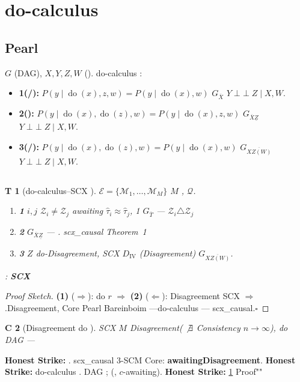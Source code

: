 \documentclass[11pt,a4paper,twoside]{article}
\newtheorem{theorem}Theorem[section]
\newtheorem{corollary}[theorem]Corollary
\DeclareMathOperator{\doop}{do}
\DeclareMathOperator{\indep}{\perp\!\!\!\perp}
\begin{document}
\section{do-calculus}
\subsection{Pearl}
 $G$ (DAG), $X, Y, Z, W$ ().
do-calculus \citep{pearl2009causality}: 
\begin{itemize}[leftmargin=*]
 \item \textbf{ 1(/): }
 $P(y \mid \doop(x), z, w) = P(y \mid \doop(x), w)$
 $G_{\overline{X}}$ $Y \indep Z \mid X, W$.
 \item \textbf{ 2(): }
 $P(y \mid \doop(x), \doop(z), w) = P(y \mid \doop(x), z, w)$
 $G_{\overline{X}\underline{Z}}$ $Y \indep Z \mid X, W$.
 \item \textbf{ 3(/): }
 $P(y \mid \doop(x), \doop(z), w) = P(y \mid \doop(x), w)$
 $G_{\overline{XZ(W)}}$ $Y \indep Z \mid X, W$.
\end{itemize}
\subsection{}
\begin{theorem}[do-calculus--SCX ]\label{thm:bridge}
 $\mathcal{E} = \{\mathcal{M}_1, \ldots, \mathcal{M}_M\}$ $M$ 
, $\mathcal{Q}$.
\begin{enumerate}[label=(\arabic*),leftmargin=*]
 \item \textbf{ 1}
 $i, j$ $\mathcal{Z}_i \neq \mathcal{Z}_j$
 awaiting $\hat{\tau}_i \approx \hat{\tau}_j$, 1 
 $G_{\overline{T}}$ ---
 $\mathcal{Z}_i \triangle \mathcal{Z}_j$ 
 \item \textbf{ 2}
 $G_{\overline{X}\underline{Z}}$ ---
 . scx\_causal Theorem~1 
 \item \textbf{ 3}
 $Z$ do-Disagreement, SCX 
 $D_{\text{IV}}$ (Disagreement)
 $G_{\overline{XZ(W)}}$.
\end{enumerate}
: \textbf{SCX}
\end{theorem}
\begin{proof}[Proof Sketch]
\noindent\textbf{(1)} ($\Rightarrow$): do $r$ $\Rightarrow$
\noindent\textbf{(2)} ($\Leftarrow$): Disagreement SCX 
$\Rightarrow$.Disagreement, 
Core Pearl Bareinboim ---do-calculus 
 \citep{pearl2009causality, bareinboim2012}---
 scx\_causal.\hfill $\square$
\end{proof}
\begin{corollary}[Disagreement do ]
 SCX $M$ Disagreement(
$\not\exists$ Consistency $n \to \infty$), 
do  DAG ---
\end{corollary}
\begin{honestbox}
\textbf{Honest Strike: }.
 scx\_causal 3-SCM Core: 
\textbf{awaitingDisagreement}.
\textbf{Honest Strike: } do-calculus 
 \citep{huang2006}. DAG 
; (, $c$-awaiting).
\textbf{Honest Strike: } \ref{thm:bridge} Proof""
\end{honestbox}
\end{document}
